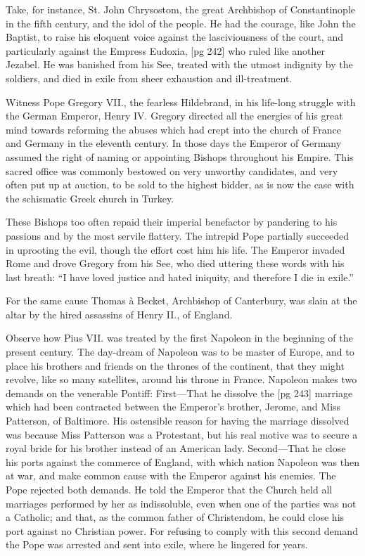 Take, for instance, St. John Chrysostom, the
great Archbishop of Constantinople in the fifth
century, and the idol of the people. He had the
courage, like John the Baptist, to raise his eloquent
voice against the lasciviousness of the
court, and particularly against the Empress Eudoxia,
[pg 242]
who ruled like another Jezabel. He was
banished from his See, treated with the utmost
indignity by the soldiers, and died in exile from
sheer exhaustion and ill-treatment.

Witness Pope Gregory VII., the fearless Hildebrand,
in his life-long struggle with the German
Emperor, Henry IV. Gregory directed all the
energies of his great mind towards reforming the
abuses which had crept into the church of France
and Germany in the eleventh century. In those
days the Emperor of Germany assumed the right
of naming or appointing Bishops throughout his
Empire. This sacred office was commonly bestowed
on very unworthy candidates, and very
often put up at auction, to be sold to the highest
bidder, as is now the case with the schismatic
Greek church in Turkey.

These Bishops too often repaid their imperial
benefactor by pandering to his passions and by
the most servile flattery. The intrepid Pope partially
succeeded in uprooting the evil, though the
effort cost him his life. The Emperor invaded
Rome and drove Gregory from his See, who died
uttering these words with his last breath: “I have
loved justice and hated iniquity, and therefore
I die in exile.”

For the same cause Thomas à Becket, Archbishop
of Canterbury, was slain at the altar by
the hired assassins of Henry II., of England.

Observe how Pius VII. was treated by the first
Napoleon in the beginning of the present century.
The day-dream of Napoleon was to be master of
Europe, and to place his brothers and friends
on the thrones of the continent, that they might
revolve, like so many satellites, around his throne
in France. Napoleon makes two demands on the
venerable Pontiff: First—That he dissolve the
[pg 243]
marriage which had been contracted between the
Emperor's brother, Jerome, and Miss Patterson,
of Baltimore. His ostensible reason for having
the marriage dissolved was because Miss Patterson
was a Protestant, but his real motive was
to secure a royal bride for his brother instead
of an American lady. Second—That he close his
ports against the commerce of England, with
which nation Napoleon was then at war, and make
common cause with the Emperor against his
enemies. The Pope rejected both demands. He
told the Emperor that the Church held all marriages
performed by her as indissoluble, even
when one of the parties was not a Catholic; and
that, as the common father of Christendom, he
could close his port against no Christian power.
For refusing to comply with this second demand
the Pope was arrested and sent into exile, where
he lingered for years.

